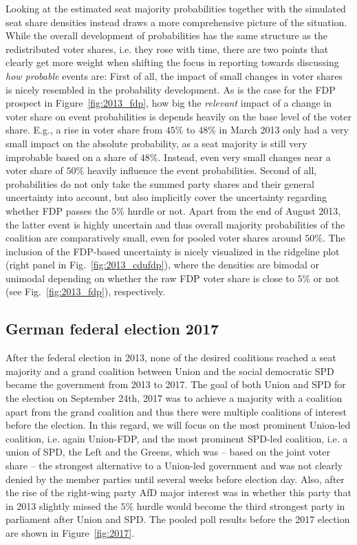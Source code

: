 \documentclass[smallcondensed]{svjour3}     %
\begin{document}
Looking at the estimated seat majority probabilities together with
the simulated seat share densities instead draws a more comprehensive picture
of the situation.
While the overall development of probabilities has the same structure
as the redistributed voter shares, i.e. they rose with time,
there are two points that clearly get more weight when shifting
the focus in reporting towards discussing {\it how probable} events are:
First of all, the impact of small changes in voter shares is nicely resembled
in the probability development. As is the case for the FDP prospect in Figure~\ref{fig:2013_fdp},
how big the {\it relevant} impact of a change in voter share on event
probabilities is depends heavily on the base level of the voter share.
E.g., a rise in voter share from $45\%$ to $48\%$ in March 2013 only had a very small impact on
the absolute probability, as a seat majority is still very improbable based on a share of $48\%$.
Instead, even very small changes near a voter share of $50\%$ heavily influence the event probabilities.
Second of all, probabilities do not only take the summed party
shares and their general uncertainty into account,
but also implicitly cover the
uncertainty regarding whether FDP passes the $5\%$ hurdle
or not. Apart from the end of August 2013, the latter event
is highly uncertain and thus overall majority probabilities of
the coalition are comparatively small, even for pooled voter shares around $50\%$.
The inclusion of the FDP-based uncertainty is nicely visualized in the
ridgeline plot (right panel in Fig.~\ref{fig:2013_cdufdp}), where
the densities are bimodal or unimodal depending on whether the raw FDP voter share
is close to $5\%$ or not (see Fig.~\ref{fig:2013_fdp}), respectively.



\subsection{German federal election 2017} \label{subsec:2017}
After the federal election in 2013, none of the desired coalitions
reached a seat majority
and a grand coalition between Union and the social democratic SPD
became the government from 2013 to 2017.
The goal of both Union and SPD for the election on September 24th, 2017
was to achieve a majority with a coalition apart from the grand coalition
and thus there were multiple coalitions of interest before the election.
In this regard, we will focus on the most prominent Union-led coalition,
i.e. again Union-FDP, and the most prominent SPD-led coalition,
i.e. a union of SPD, the Left and the Greens, which was
-- based on the joint voter share -- the strongest alternative to a Union-led
government and was not clearly denied by the member parties until several weeks
before election day.
Also, after the rise of the right-wing party AfD major interest was
in whether this party that in 2013 slightly missed the $5\%$ hurdle
would become the third strongest party in parliament after Union and SPD.
The pooled poll results before the 2017 election are shown in Figure~\ref{fig:2017}.
\end{document}

